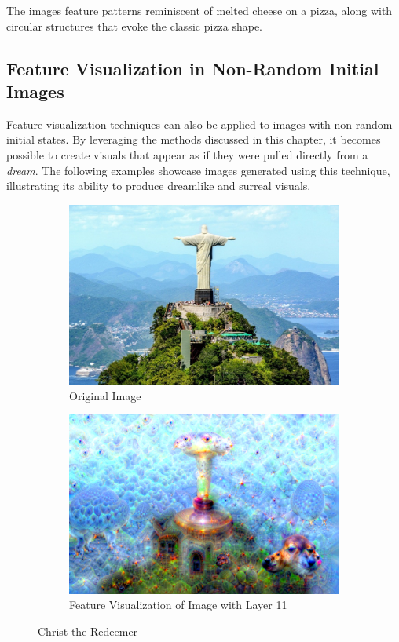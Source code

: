 The images feature patterns reminiscent of melted cheese on a pizza, along with circular structures that evoke the classic pizza shape.
\subsection{Feature Visualization in Non-Random Initial Images}


Feature visualization techniques can also be applied to images with non-random initial states. 
By leveraging the methods discussed in this chapter, it becomes possible to create visuals that appear as if they were pulled directly from a \emph{dream}\footnotemark.
The following examples showcase images generated using this technique, illustrating its ability to produce dreamlike and surreal visuals.

\begin{figure}
    \captionsetup{justification=centering}

    \begin{subfigure}[t]{0.45\textwidth}
        \captionsetup{justification=centering}
        \centering
        \includegraphics[width=.7\linewidth]{figuras/feat_vis/experiments/non_random/christ-the-redeemer.jpg}
        \caption{Original Image}
    \end{subfigure}
    \hfill
    \begin{subfigure}[t]{0.45\textwidth}
        \captionsetup{justification=centering}
        \centering
        \includegraphics[width=.7\linewidth]{figuras/feat_vis/experiments/non_random/christ-the-redeemer_li24_lr8e-2_pl4.png}
        \caption{Feature Visualization of Image with Layer 11}
    \end{subfigure}

    \caption{Christ the Redeemer}
    \label{fig:christ_dream}
\end{figure}


